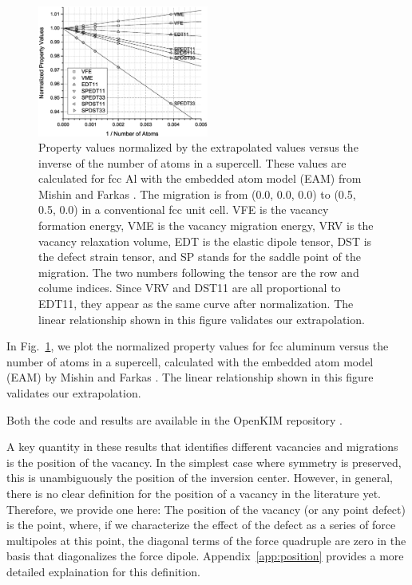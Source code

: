 \documentclass[%
 reprint,
 amsmath,amssymb,
 aps,
]{revtex4-1}
\begin{document}
\begin{figure}
\centering
\includegraphics[width=0.5\textwidth, clip, trim = 10mm 10mm 10mm 10mm]{extrapolation2}%
\caption{\label{fig:extrapolation}
Property values normalized by the extrapolated values versus the inverse of the number of atoms in a supercell.
These values are calculated for fcc Al with the embedded atom model (EAM) from Mishin and Farkas \cite{mishin1999interatomic}.
The migration is from (0.0, 0.0, 0.0) to (0.5, 0.5, 0.0) in a conventional fcc unit cell.
VFE is the vacancy formation energy, VME is the vacancy migration energy, VRV is the vacancy relaxation volume, EDT is the elastic dipole tensor, DST is the defect strain tensor, and SP stands for the saddle point of the migration.
The two numbers following the tensor are the row and colume indices.
Since VRV and DST11 are all proportional to EDT11, they appear as the same curve after normalization.
The linear relationship shown in this figure validates our extrapolation.
}
\end{figure}

In Fig.~\ref{fig:extrapolation}, we plot the normalized property values for fcc aluminum versus the number of atoms in a supercell, calculated with the embedded atom model (EAM) by Mishin and Farkas \cite{mishin1999interatomic}.
The linear relationship shown in this figure validates our extrapolation.

Both the code and results are available in the OpenKIM repository \cite{openkim2016}.

A key quantity in these results that identifies different vacancies and migrations is the position of the vacancy.
In the simplest case where symmetry is preserved, this is unambiguously the position of the inversion center.
However, in general, there is no clear definition for the position of a vacancy in the literature yet.
Therefore, we provide one here:
The position of the vacancy (or any point defect) is the point, where, if we characterize the effect of the defect as a series of force multipoles at this point, the diagonal terms of the force quadruple are zero in the basis that diagonalizes the force dipole.
Appendix~\ref{app:position} provides a more detailed explaination for this definition.
\end{document}
